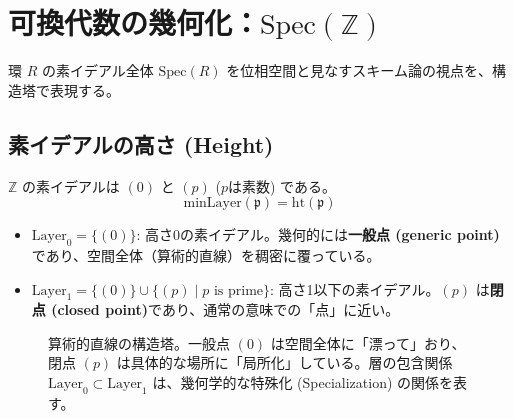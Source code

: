 \documentclass[a4paper,11pt]{ltjsarticle}
\theoremstyle{definition}
\newcommand{\Z}{\mathbb{Z}}
\newcommand{\Spec}{\mathrm{Spec}}
\newcommand{\Layer}[1]{\mathrm{Layer}_{#1}}
\newcommand{\MinLayer}{\mathrm{minLayer}}
\begin{document}
\section{可換代数の幾何化：$\Spec(\Z)$}

環 $R$ の素イデアル全体 $\Spec(R)$ を位相空間と見なすスキーム論の視点を、構造塔で表現する。

\subsection{素イデアルの高さ (Height)}
$\Z$ の素イデアルは $(0)$ と $(p)$ ($p$は素数) である。
\[ \MinLayer(\mathfrak{p}) = \mathrm{ht}(\mathfrak{p}) \]

\begin{itemize}
    \item $\Layer{0} = \{(0)\}$: 高さ0の素イデアル。幾何的には\textbf{一般点 (generic point)}であり、空間全体（算術的直線）を稠密に覆っている。
    \item $\Layer{1} = \{(0)\} \cup \{(p) \mid p \text{ is prime}\}$: 高さ1以下の素イデアル。$(p)$ は\textbf{閉点 (closed point)}であり、通常の意味での「点」に近い。
\end{itemize}

\begin{figure}[h]
\centering
{}
\caption{算術的直線の構造塔。一般点 $(0)$ は空間全体に「漂って」おり、閉点 $(p)$ は具体的な場所に「局所化」している。層の包含関係 $\Layer{0} \subset \Layer{1}$ は、幾何学的な特殊化 (Specialization) の関係を表す。}
\end{figure}
\end{document}
